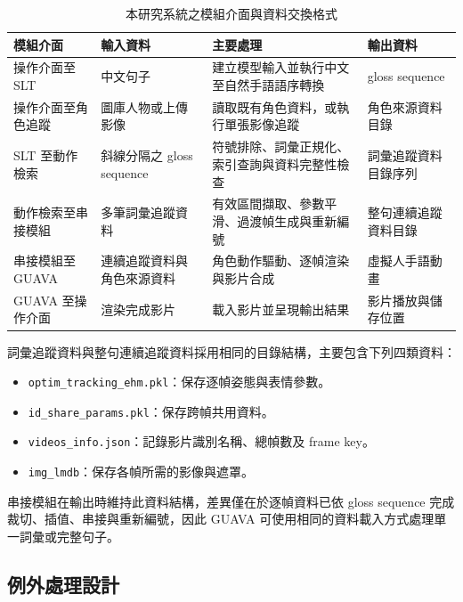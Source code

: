\documentclass[class=NCU_thesis, crop=false]{standalone}
\begin{document}
\begin{table}[H]
    \centering
    \caption{本研究系統之模組介面與資料交換格式}
    \label{tab:system_integration_io}
    \renewcommand{\arraystretch}{1.25}
    \setlength{\tabcolsep}{4pt}
    \begin{tabular}{p{}p{}p{}p{}}
        \toprule
        \textbf{模組介面} & \textbf{輸入資料} & \textbf{主要處理} & \textbf{輸出資料} \\
        \midrule
        操作介面至 SLT & 中文句子 & 建立模型輸入並執行中文至自然手語語序轉換 & gloss sequence \\
        操作介面至角色追蹤 & 圖庫人物或上傳影像 & 讀取既有角色資料，或執行單張影像追蹤 & 角色來源資料目錄 \\
        SLT 至動作檢索 & 斜線分隔之 gloss sequence & 符號排除、詞彙正規化、索引查詢與資料完整性檢查 & 詞彙追蹤資料目錄序列 \\
        動作檢索至串接模組 & 多筆詞彙追蹤資料 & 有效區間擷取、參數平滑、過渡幀生成與重新編號 & 整句連續追蹤資料目錄 \\
        串接模組至 GUAVA & 連續追蹤資料與角色來源資料 & 角色動作驅動、逐幀渲染與影片合成 & 虛擬人手語動畫 \\
        GUAVA 至操作介面 & 渲染完成影片 & 載入影片並呈現輸出結果 & 影片播放與儲存位置 \\
        \bottomrule
    \end{tabular}
\end{table}

詞彙追蹤資料與整句連續追蹤資料採用相同的目錄結構，主要包含下列四類資料：

\begin{itemize}
    \item \texttt{optim\_tracking\_ehm.pkl}：保存逐幀姿態與表情參數。
    \item \texttt{id\_share\_params.pkl}：保存跨幀共用資料。
    \item \texttt{videos\_info.json}：記錄影片識別名稱、總幀數及 frame key。
    \item \texttt{img\_lmdb}：保存各幀所需的影像與遮罩。
\end{itemize}

串接模組在輸出時維持此資料結構，差異僅在於逐幀資料已依 gloss sequence 完成裁切、插值、串接與重新編號，因此 GUAVA 可使用相同的資料載入方式處理單一詞彙或完整句子。

\subsection{例外處理設計}
\end{document}
